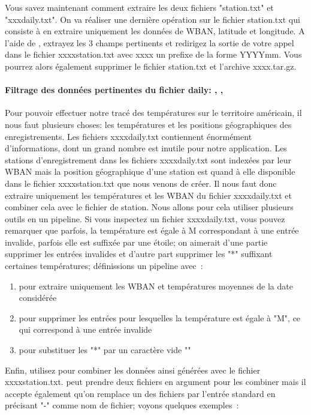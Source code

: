 Vous savez maintenant comment extraire les deux fichiers "station.txt" et "xxxdaily.txt". On va réaliser une dernière opération sur le fichier station.txt qui consiste à en extraire uniquement les données de WBAN, latitude et longitude. A l'aide de \awk, extrayez les 3 champs pertinents et redirigez la sortie de votre appel \awk dans le fichier xxxxstation.txt avec xxxx un prefixe de la forme YYYYmm. Vous pourrez alors également supprimer le fichier station.txt et l'archive xxxx.tar.gz.

\paragraph{Filtrage des données pertinentes du fichier daily: \awk, \sed, \join}

Pour pouvoir effectuer notre tracé des températures sur le territoire américain, il nous faut plusieurs choses: les températures et les positions géographiques des enregistrements. Les fichiers xxxxdaily.txt contiennent énormément d'informations, dont un grand nombre est inutile pour notre application. Les stations d'enregistrement dans les fichiers xxxxdaily.txt sont indexées par leur WBAN mais la position géographique d'une station est quand à elle disponible dans le fichier xxxxstation.txt que nous venons de créer. Il nous faut donc extraire uniquement les températures et les WBAN du fichier xxxxdaily.txt et combiner cela avec le fichier de station. Nous allons pour cela utiliser plusieurs outils en un pipeline. Si vous inspectez un fichier xxxxdaily.txt, vous pouvez remarquer que parfois, la température est égale à M correspondant à une entrée invalide, parfois elle est suffixée par une étoile; on aimerait d'une partie supprimer les entrées invalides et d'autre part supprimer les "*" suffixant certaines températures; définissions un pipeline avec~:
\begin{enumerate}
\item \awk pour extraire uniquement les WBAN et températures moyennes de la date considérée
\item \awk pour supprimer les entrées pour lesquelles la température est égale à "M", ce qui correspond à une entrée invalide
\item \sed pour substituer les "*" par un caractère vide ""
\end{enumerate}
Enfin, utilisez \join pour combiner les données ainsi générées avec le fichier xxxxstation.txt. \join peut prendre deux fichiers en argument pour les combiner mais il accepte également qu'on remplace un des fichiers par l'entrée standard en précisant "-" comme nom de fichier; voyons quelques exemples~:
